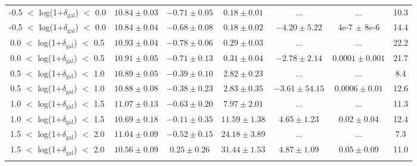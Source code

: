 \documentclass[a4paper,fleqn,usenatbib]{mnras}
\begin{document}
\begin{table*}
\begin{center}
\begin{tabular}{ccccccc}
    -0.5 $<$ log(1+$\delta_{\mathrm{gal}}$) $<$ 0.0 & $10.84\pm0.03$ & $-0.71\pm0.05$ & $ 0.18\pm0.01$ & ... & ... & 10.3  \\
    -0.5 $<$ log(1+$\delta_{\mathrm{gal}}$) $<$ 0.0 & $10.84\pm0.04$ & $-0.68\pm0.08$ & $ 0.18\pm0.02$ & $-4.20\pm5.22$ & 4e-7 $\pm$ 8e-6 & 14.4  \\[-0.5mm]
    \hline
    0.0 $<$ log(1+$\delta_{\mathrm{gal}}$) $<$ 0.5 & $10.93\pm0.04$ & $-0.78\pm0.06$ & $ 0.29\pm0.03$ & ... & ... & 22.2  \\
    0.0 $<$ log(1+$\delta_{\mathrm{gal}}$) $<$ 0.5 & $10.91\pm0.05$ & $-0.71\pm0.13$ & $ 0.31\pm0.04$ & $-2.78\pm2.14$ & $ 0.0001\pm0.001$ & 21.7  \\[-0.5mm]
    \hline
    0.5 $<$ log(1+$\delta_{\mathrm{gal}}$) $<$ 1.0 & $10.89\pm0.05$ & $-0.39\pm0.10$ & $ 2.82\pm0.23$ & ... & ... &  8.4  \\
    0.5 $<$ log(1+$\delta_{\mathrm{gal}}$) $<$ 1.0 & $10.88\pm0.08$ & $-0.38\pm0.23$ & $ 2.83\pm0.35$ & $-3.61\pm54.15$ & $ 0.0006\pm0.01$ & 12.6  \\[-0.5mm]
    \hline
    1.0 $<$ log(1+$\delta_{\mathrm{gal}}$) $<$ 1.5 & $11.07\pm0.13$ & $-0.63\pm0.20$ & $ 7.97\pm2.01$ & ... & ... & 11.3  \\
    1.0 $<$ log(1+$\delta_{\mathrm{gal}}$) $<$ 1.5 & $10.69\pm0.18$ & $-0.11\pm0.35$ & $11.59\pm1.38$ & $ 4.65\pm1.23$ & $ 0.02\pm0.04$ & 12.4  \\[-0.5mm]
    \hline
    1.5 $<$ log(1+$\delta_{\mathrm{gal}}$) $<$ 2.0 & $11.04\pm0.09$ & $-0.52\pm0.15$ & $24.18\pm3.89$ & ... & ... &  7.3  \\
    1.5 $<$ log(1+$\delta_{\mathrm{gal}}$) $<$ 2.0 & $10.56\pm0.09$ & $ 0.25\pm0.26$ & $31.44\pm1.53$ & $ 4.87\pm1.09$ & $ 0.05\pm0.09$ & 11.0  \\
	\hline \\[-2.5mm]


	\end{tabular}
	\end{center}
\end{table*}
\end{document}
